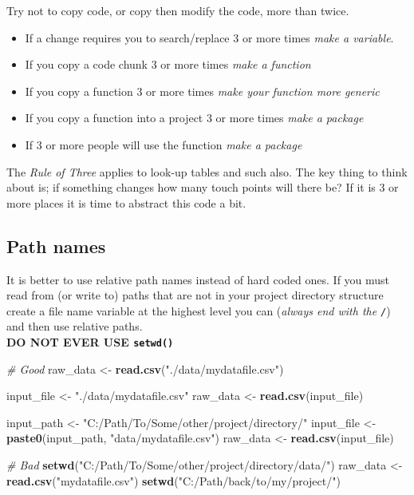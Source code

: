 \documentclass[]{book}
\newenvironment{Shaded}{\begin{snugshade}}{\end{snugshade}}
\newcommand{\KeywordTok}[1]{\textcolor[rgb]{0.13,0.29,0.53}{\textbf{#1}}}
\newcommand{\StringTok}[1]{\textcolor[rgb]{0.31,0.60,0.02}{#1}}
\newcommand{\CommentTok}[1]{\textcolor[rgb]{0.56,0.35,0.01}{\textit{#1}}}
\newcommand{\NormalTok}[1]{#1}
\providecommand{\tightlist}{%
  \setlength{\itemsep}{0pt}\setlength{\parskip}{0pt}}
\theoremstyle{definition}
\theoremstyle{definition}
\theoremstyle{definition}
\theoremstyle{remark}
\begin{document}
Try not to copy code, or copy then modify the code, more than twice.

\begin{itemize}
\tightlist
\item
  If a change requires you to search/replace 3 or more times \emph{make
  a variable}.
\item
  If you copy a code chunk 3 or more times \emph{make a function}
\item
  If you copy a function 3 or more times \emph{make your function more
  generic}
\item
  If you copy a function into a project 3 or more times \emph{make a
  package}
\item
  If 3 or more people will use the function \emph{make a package}
\end{itemize}

The \emph{Rule of Three} applies to look-up tables and such also. The
key thing to think about is; if something changes how many touch points
will there be? If it is 3 or more places it is time to abstract this
code a bit.

\subsection{Path names}\label{path-names}

It is better to use relative path names instead of hard coded ones. If
you must read from (or write to) paths that are not in your project
directory structure create a file name variable at the highest level you
can (\emph{always end with the \texttt{/}}) and then use relative
paths.\\
\textbf{DO NOT EVER USE \texttt{setwd()}}

\begin{Shaded}
\begin{Highlighting}[]
\CommentTok{# Good}
\NormalTok{raw_data <-}\StringTok{ }\KeywordTok{read.csv}\NormalTok{(}\StringTok{"./data/mydatafile.csv"}\NormalTok{) }

\NormalTok{input_file <-}\StringTok{ "./data/mydatafile.csv"}
\NormalTok{raw_data <-}\StringTok{ }\KeywordTok{read.csv}\NormalTok{(input_file)  }

\NormalTok{input_path <-}\StringTok{ "C:/Path/To/Some/other/project/directory/"}
\NormalTok{input_file <-}\StringTok{ }\KeywordTok{paste0}\NormalTok{(input_path, }\StringTok{"data/mydatafile.csv"}\NormalTok{)}
\NormalTok{raw_data <-}\StringTok{ }\KeywordTok{read.csv}\NormalTok{(input_file)}

\CommentTok{# Bad}
\KeywordTok{setwd}\NormalTok{(}\StringTok{"C:/Path/To/Some/other/project/directory/data/"}\NormalTok{)}
\NormalTok{raw_data <-}\StringTok{ }\KeywordTok{read.csv}\NormalTok{(}\StringTok{"mydatafile.csv"}\NormalTok{)}
\KeywordTok{setwd}\NormalTok{(}\StringTok{"C:/Path/back/to/my/project/"}\NormalTok{)}
\end{Highlighting}
\end{Shaded}
\end{document}
